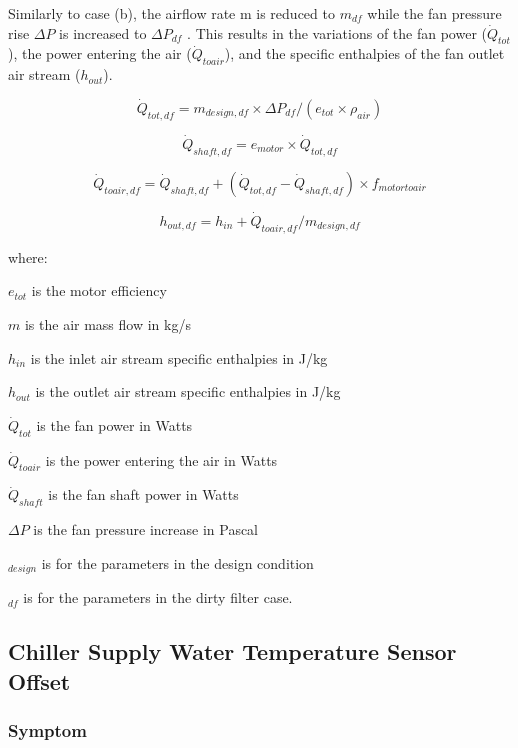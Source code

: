 Similarly to case (b), the airflow rate m is reduced to \(m_{df}\) while the fan pressure rise \(\Delta P\) is increased to \(\Delta P_{df}\) . This results in the variations of the fan power (\(\dot Q_{tot}\)), the power entering the air (\(\dot Q_{toair}\)), and the specific enthalpies of the fan outlet air stream (\(h_{out}\)).

\begin{equation}
\dot{Q}_{tot,df} = m_{design,df} \times \Delta P_{df} / (e_{tot} \times \rho_{air} )
\end{equation}

\begin{equation}
\dot{Q}_{shaft,df} = e_{motor} \times \dot{Q}_{tot, df}
\end{equation}

\begin{equation}
\dot{Q}_{toair,df} = \dot{Q}_{shaft,df} +( \dot{Q}_{tot,df} - \dot{Q}_{shaft,df}) \times f_{motortoair}
\end{equation}

\begin{equation}
h_{out,df} = h_{in} + \dot{Q}_{toair,df} / m_{design,df}
\end{equation}

where:

\(e_{tot}\) is the motor efficiency

\(m\) is the air mass flow in kg/s

\(h_{in}\) is the inlet air stream specific enthalpies in J/kg

\(h_{out}\) is the outlet air stream specific enthalpies in J/kg

\(\dot{Q}_{tot}\) is the fan power in Watts

\(\dot{Q}_{toair}\) is the power entering the air in Watts

\(\dot{Q}_{shaft}\) is the fan shaft power in Watts

\(\Delta P\) is the fan pressure increase in Pascal

\(_{design}\) is for the parameters in the design condition

\(_{df}\) is for the parameters in the dirty filter case.


\subsection{Chiller Supply Water Temperature Sensor Offset}\label{chiller-supply-water-temperature-sensor-offset}

\subsubsection{Symptom}

